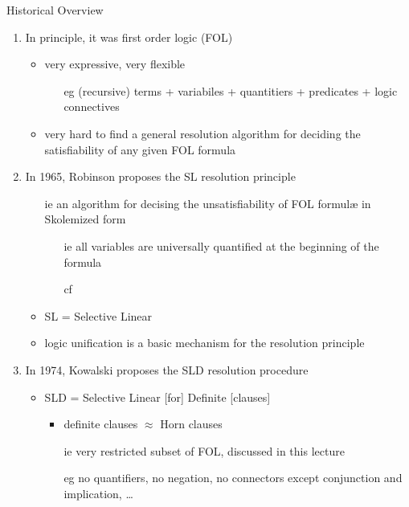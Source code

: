 \documentclass[presentation]{beamer}\mode<presentation>{\usetheme{AMSBolognaFC}}
\begin{document}
\begin{frame}[allowframebreaks]{Historical Overview}
    \begin{enumerate}
        \item In principle, it was first order logic (FOL)
        \begin{itemize}
            \item very expressive, very flexible
            \begin{itemize}
                \item[eg] (recursive) terms + variabiles + quantitiers + predicates + logic connectives
            \end{itemize}

            \item very hard to find a general \alert{resolution} algorithm for deciding the \alert{satisfiability} of any given FOL formula
        \end{itemize}

        \bigskip

        \item In 1965, Robinson proposes the \alert{SL resolution principle}
        \begin{itemize}
            \item[ie] an algorithm for decising the \alert{unsatisfiability} of FOL formul\ae{} in \alert{Skolemized form}
            \begin{itemize}
                \item[ie] all variables are \alert{universally} quantified at the beginning of the formula
                \item[cf]  
            \end{itemize}

            \item SL = Selective Linear
            \item logic \alert{unification} is a basic mechanism for the resolution principle
        \end{itemize}

        \framebreak

        \item In 1974, Kowalski proposes the SL\alert{D} resolution procedure
        \begin{itemize}
            \item SL\alert{D} = Selective Linear [for] \alert{Definite} [clauses]
            \begin{itemize}
                \item definite clauses $\approx$ Horn clauses
                \item[ie] very restricted subset of FOL, discussed in this lecture
                \item[eg] no quantifiers, no negation, no connectors except conjunction and implication, \ldots
            \end{itemize}
        \end{itemize}


\end{enumerate}
\end{frame}
\end{document}
